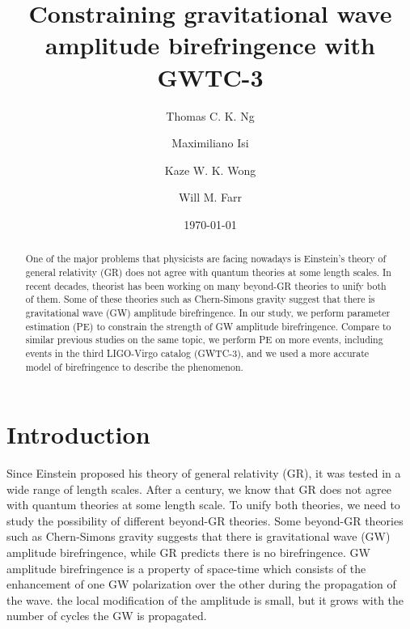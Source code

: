 \documentclass[reprint,amsmath,amssymb,aps,twocolumn]{aastex631}
\begin{document}
\title{Constraining gravitational wave amplitude birefringence with GWTC-3}

\author{Thomas C. K. Ng}

\author{Maximiliano Isi}

\author{Kaze W. K. Wong}

\author{Will M. Farr}

\date{\today}

\begin{abstract}
    One of the major problems that physicists are facing nowadays is Einstein's theory of general relativity (GR) does not agree with quantum theories at some length scales.
    In recent decades, theorist has been working on many beyond-GR theories to unify both of them.
    Some of these theories such as Chern-Simons gravity suggest that there is gravitational wave (GW) amplitude birefringence.
    In our study, we perform parameter estimation (PE) to constrain the strength of GW amplitude birefringence.
    Compare to similar previous studies on the same topic, we perform PE on more events, including events in the third LIGO-Virgo catalog (GWTC-3), and we used a more accurate model of birefringence to describe the phenomenon.
\end{abstract}

\section{Introduction}
\label{sec:Introduction}
Since Einstein proposed his theory of general relativity (GR), it was tested in a wide range of length scales.
After a century, we know that GR does not agree with quantum theories at some length scale.
To unify both theories, we need to study the possibility of different beyond-GR theories.
Some beyond-GR theories such as Chern-Simons gravity suggests that there is gravitational wave (GW) amplitude birefringence, while GR predicts there is no birefringence.
GW amplitude birefringence is a property of space-time which consists of the enhancement of one GW polarization over the other during the propagation of the wave.
the local modification of the amplitude is small, but it grows with the number of cycles the GW is propagated.
\end{document}
